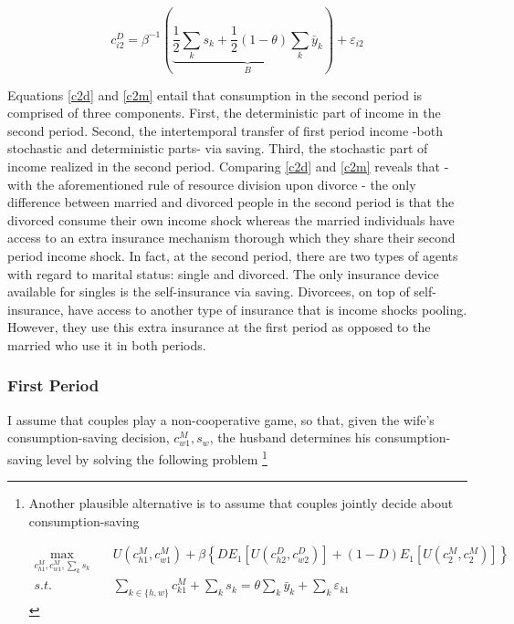 \begin{equation}
c_{i2}^D = \beta^{-1} \left ( \underbrace{\dfrac{1}{2} \sum_k s_k + \dfrac{1}{2} (1-\theta) \sum_k \bar y_k}_{B} \right ) + \varepsilon_{i2} 
\label{c2d}
\end{equation}

Equations \eqref{c2d} and \eqref{c2m} entail that consumption in the second period is comprised of three components. First, the deterministic part of income in the second period. Second, the intertemporal transfer of first period income -both stochastic and deterministic parts- via saving. Third, the stochastic part of income realized in the second period. Comparing \eqref{c2d} and \eqref{c2m}  reveals that - with the aforementioned rule of resource division upon divorce - the only difference between married and divorced people in the second period is that the divorced consume their own income shock whereas the married individuals have access to an extra insurance mechanism thorough which they share their second period income shock. In fact, at the second period, there are two types of agents with regard to marital status: single and divorced. The only insurance device available for singles is the self-insurance via saving. Divorcees, on top of self-insurance, have access to another type of insurance that is income shocks pooling. However, they use this extra insurance at the first period as opposed to the married who use it in both periods.  

\subsubsection{First Period}

I assume that couples play a non-cooperative game, so that, given the wife's consumption-saving decision, $c_{w1}^M, s_w$, the husband determines his consumption-saving level by solving the following problem \footnote{Another plausible alternative is to assume that couples jointly decide about consumption-saving 

\begin{align*}
\max_{c_{h1}^M, c_{w1}^M, \sum_{k} s_k} \quad  &U(c_{h1}^M, c_{w1}^M) + \beta \left \{ D E_1[ U(c^D_{h2}, c^D_{w2})] + (1-D) E_1 [U(c_{2}^M, c_{2}^M)] \right \}  \\
s.t. &\sum_{k \in \{h,w\}} c^M_{k1} + \sum_k s_k = \theta \sum_k \bar y_k + \sum_k \varepsilon_{k1}
\end{align*}

}



